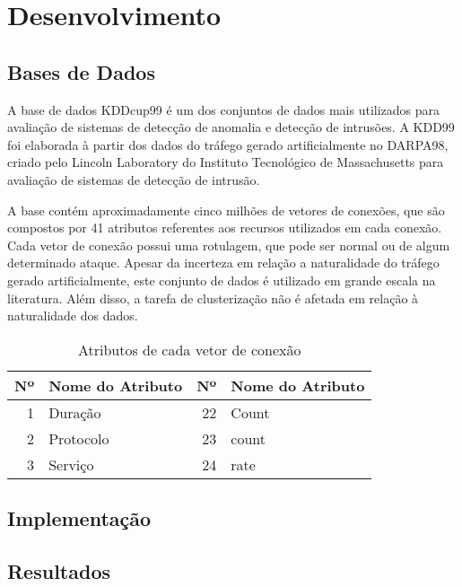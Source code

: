 \chapter{Desenvolvimento}

  \section{Bases de Dados}

\indent A base de dados KDDcup99 é um dos conjuntos de dados mais utilizados para avaliação de sistemas de detecção de anomalia e detecção de intrusões. A KDD99 foi elaborada à partir dos dados do tráfego gerado artificialmente no DARPA98, criado pelo Lincoln Laboratory do Instituto Tecnológico de Massachusetts para avaliação de sistemas de detecção de intrusão.

\indent A base contém aproximadamente cinco milhões de vetores de conexões, que são compostos por 41 atributos referentes aos recursos utilizados em cada conexão. Cada vetor de conexão possui uma rotulagem, que pode ser normal ou de algum determinado ataque. Apesar da incerteza em relação a naturalidade do tráfego gerado artificialmente, este conjunto de dados é utilizado em grande escala na literatura. Além disso, a tarefa de clusterização não é afetada em relação à naturalidade dos dados.

\begin{table}[h]
\centering
\caption{Atributos de cada vetor de conexão}
\vspace{0.5cm}
\begin{tabular}{|r|l|r|l|}
\hline
 Nº & Nome do Atributo & Nº & Nome do Atributo \\
\hline                               
1 & Duração & 22 & Count \\
2 & Protocolo & 23 & count \\
3 & Serviço & 24 & rate\\
\hline
\end{tabular}
\end{table}




  \section{Implementação}

  \section{Resultados}
